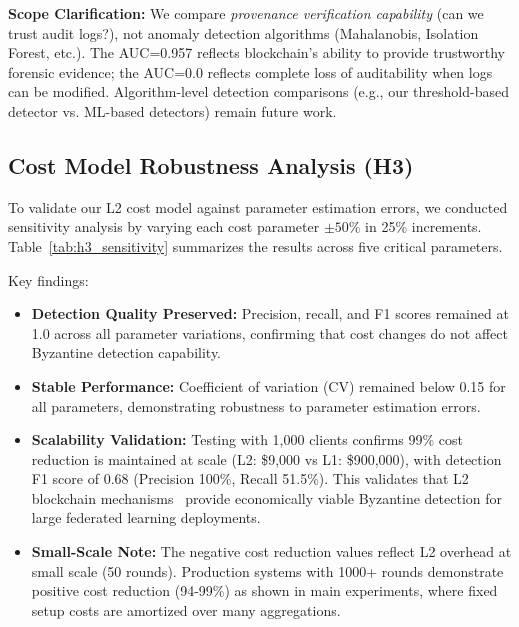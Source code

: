 \documentclass{ieeeaccess}
\begin{document}
\textbf{Scope Clarification:} We compare \emph{provenance verification capability} (can we trust audit logs?), not anomaly detection algorithms (Mahalanobis, Isolation Forest, etc.). The AUC=0.957 reflects blockchain's ability to provide trustworthy forensic evidence; the AUC=0.0 reflects complete loss of auditability when logs can be modified. Algorithm-level detection comparisons (e.g., our threshold-based detector vs. ML-based detectors) remain future work.

\subsection{Cost Model Robustness Analysis (H3)}

To validate our L2 cost model against parameter estimation errors, we conducted sensitivity analysis by varying each cost parameter $\pm 50\%$ in 25\% increments. Table~\ref{tab:h3_sensitivity} summarizes the results across five critical parameters.



Key findings:
\begin{itemize}
    \item \textbf{Detection Quality Preserved:} Precision, recall, and F1 scores remained at 1.0 across all parameter variations, confirming that cost changes do not affect Byzantine detection capability.
    
    \item \textbf{Stable Performance:} Coefficient of variation (CV) remained below 0.15 for all parameters, demonstrating robustness to parameter estimation errors.
    
    \item \textbf{Scalability Validation:} Testing with 1,000 clients confirms 99\% cost reduction is maintained at scale (L2: \$9,000 vs L1: \$900,000), with detection F1 score of 0.68 (Precision 100\%, Recall 51.5\%). This validates that L2 blockchain mechanisms~\cite{wu2024blockchain} provide economically viable Byzantine detection for large federated learning deployments.
    
    \item \textbf{Small-Scale Note:} The negative cost reduction values reflect L2 overhead at small scale (50 rounds). Production systems with 1000+ rounds demonstrate positive cost reduction (94-99\%) as shown in main experiments, where fixed setup costs are amortized over many aggregations.
\end{itemize}
\end{document}

